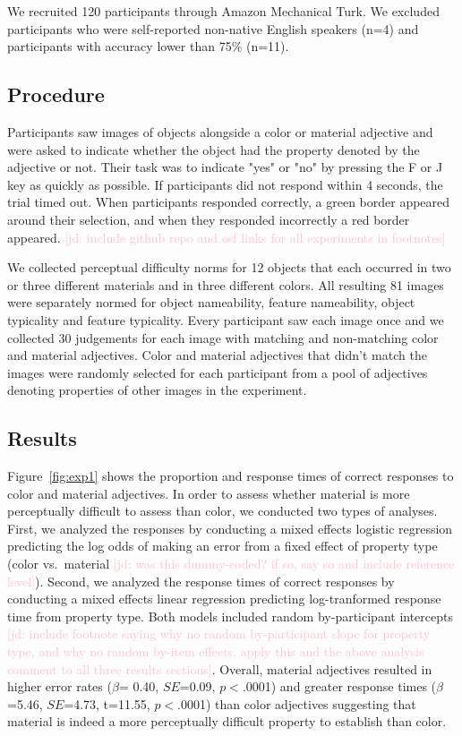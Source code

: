 \documentclass[12pt,letterpaper]{article}
\newcommand{\jd}[1]{\textcolor{Pink}{[jd: #1]}}
\begin{document}
We recruited 120 participants through Amazon Mechanical Turk. We excluded participants who were self-reported non-native English speakers (n=4) and participants with accuracy lower than 75\% (n=11).

\subsection{Procedure} 

Participants saw images of objects alongside a color or material adjective and were asked to indicate whether the object had the property denoted by the adjective or not. Their task was to indicate "yes" or "no" by pressing the F or J key as quickly as possible. If participants did not respond within 4 seconds, the trial timed out. When participants responded correctly, a green border appeared around their selection, and when they responded incorrectly a red border appeared. \jd{include github repo and osf links for all experiments in footnotes}

We collected perceptual difficulty norms for 12 objects that each occurred in two or three different materials and in three different colors. All resulting 81 images were separately normed for object nameability, feature nameability, object typicality and feature typicality. Every participant saw each image once and we collected 30 judgements for each image with matching and non-matching color and material adjectives. Color and material adjectives that didn't match the images were randomly selected for each participant from a pool of adjectives denoting properties of other images in the experiment.

\subsection{Results} 

Figure~\ref{fig:exp1} shows the proportion and response times of correct responses to color and material adjectives.  In order to assess whether material is   more perceptually difficult to assess than color, we conducted two types of analyses. First, we analyzed the responses by conducting a mixed effects logistic regression predicting the log odds of making an error from a fixed effect of property type (color vs.~material \jd{was this dummy-coded? if so, say so and include reference level}). Second, we analyzed the response times of correct responses by conducting a mixed effects linear regression predicting log-tranformed response time from property type. Both models included random by-participant intercepts \jd{include footnote saying why no random by-participant slope for property type, and why no random by-item effects. apply this and the above analysis comment to all three results sections}. Overall, material adjectives resulted in higher error rates ($\beta$= 0.40, $SE$=0.09, $p$$<$.0001) and greater response times ($\beta$=5.46, $SE$=4.73, t=11.55, $p$$<$.0001) than color adjectives suggesting that material is indeed a more perceptually difficult property to establish than color. 
\end{document}

